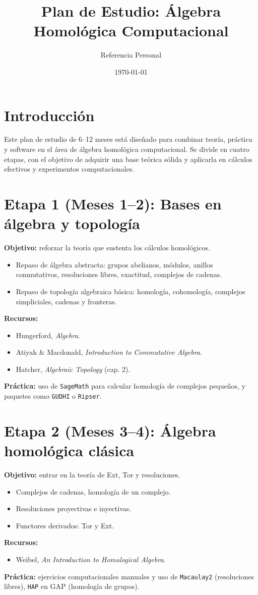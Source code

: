 \documentclass[12pt]{article}
\title{Plan de Estudio: Álgebra Homológica Computacional}
\author{Referencia Personal}
\date{\today}
\begin{document}
\maketitle

\section*{Introducción}
Este plan de estudio de 6--12 meses está diseñado para combinar teoría, práctica y software en el área de álgebra homológica computacional. Se divide en cuatro etapas, con el objetivo de adquirir una base teórica sólida y aplicarla en cálculos efectivos y experimentos computacionales.

\section*{Etapa 1 (Meses 1--2): Bases en álgebra y topología}
\textbf{Objetivo:} reforzar la teoría que sustenta los cálculos homológicos.
\begin{itemize}
    \item Repaso de álgebra abstracta: grupos abelianos, módulos, anillos conmutativos, resoluciones libres, exactitud, complejos de cadenas.
    \item Repaso de topología algebraica básica: homología, cohomología, complejos simpliciales, cadenas y fronteras.
\end{itemize}
\textbf{Recursos:}
\begin{itemize}
    \item Hungerford, \textit{Algebra}.
    \item Atiyah \& Macdonald, \textit{Introduction to Commutative Algebra}.
    \item Hatcher, \textit{Algebraic Topology} (cap. 2).
\end{itemize}
\textbf{Práctica:} uso de \texttt{SageMath} para calcular homología de complejos pequeños, y paquetes como \texttt{GUDHI} o \texttt{Ripser}.

\section*{Etapa 2 (Meses 3--4): Álgebra homológica clásica}
\textbf{Objetivo:} entrar en la teoría de Ext, Tor y resoluciones.
\begin{itemize}
    \item Complejos de cadenas, homología de un complejo.
    \item Resoluciones proyectivas e inyectivas.
    \item Functores derivados: Tor y Ext.
\end{itemize}
\textbf{Recursos:}
\begin{itemize}
    \item Weibel, \textit{An Introduction to Homological Algebra}.
\end{itemize}
\textbf{Práctica:} ejercicios computacionales manuales y uso de \texttt{Macaulay2} (resoluciones libres), \texttt{HAP} en GAP (homología de grupos).
\end{document}
